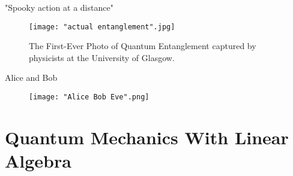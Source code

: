 \documentclass[handout, 10 pt]{beamer}
\newcommand{\icol}[1]{%
  \left(\begin{smallmatrix}#1\end{smallmatrix}\right)%
}
\begin{document}
\begin{comment}
Another shocking thing about quantum mechanics is such phenomenon described by Albert Einstein as the "spooky action at a distance". What's so spooky about it is that one event in the universe can instantaneously affect another event arbitrarily far away, which seems to imply faster than light communication. We now refer to as entanglement and will go over it in more detail later. 
\end{comment}
\begin{frame}{"Spooky action at a distance"}
\begin{figure}[h]
    \centering
    \texttt{[image: "actual entanglement".jpg]}
    \caption{The First-Ever Photo of Quantum Entanglement captured by physicists at the University of Glasgow.}
    \label{fig:actual entanglement}
\end{figure}
\end{frame}

\begin{comment}
In cryptography, Alice and Bob try to communicate securely under the pryiing eyes of Eve. In my thesis, I investigate to apply quantum mechanics phenomenon such as entanglement to enhance security in cryptography.
\end{comment}

\begin{frame}{Alice and Bob}
\begin{figure}[h]
    \centering
    \texttt{[image: "Alice Bob Eve".png]}
    \label{fig:Alice Bob Eve}
\end{figure}    
\end{frame}

\section{Quantum Mechanics With Linear Algebra}

\begin{comment}
Mathematically, a {\emph{qubit}} is a unit vector in a two-dimensional complex vector space.  In the same way that the bit is the fundamental unit of classical computation and information, the quantum bit, or qubit is the basic unit of quantum information.  With this motivation in mind, we sometimes write $\ket{0} = \icol{1\\0}$, and $\ket{1} = \icol{0\\1}$. Note that the symbols "$\ket{0}$" and "$\ket{1}$" are read "ket one" and "ket two".\footnote{We are using so-called Bra-ket notation common in quantum mechanics}  While bits may only take the values $0$ or $1$, a qubit is a complex linear combination, or \textit{superposition} of $\ket{0}$ and $\ket{1}$ with norm equal to one. 
\end{comment}
\end{document}

